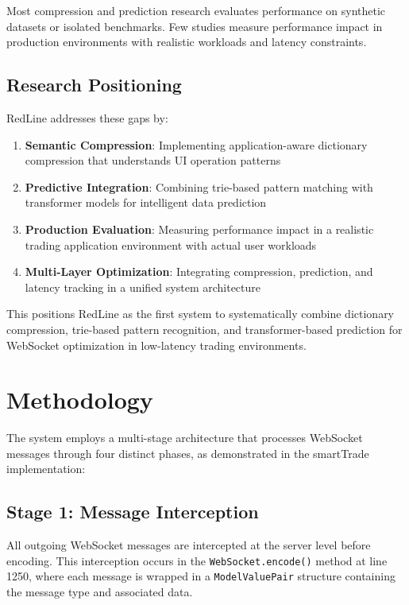 \documentclass[12pt,a4paper]{article}
\begin{document}
Most compression and prediction research evaluates performance on synthetic datasets or isolated benchmarks. Few studies measure performance impact in production environments with realistic workloads and latency constraints.

\subsection{Research Positioning}

RedLine addresses these gaps by:

\begin{enumerate}
    \item \textbf{Semantic Compression}: Implementing application-aware dictionary compression that understands UI operation patterns
    \item \textbf{Predictive Integration}: Combining trie-based pattern matching with transformer models for intelligent data prediction
    \item \textbf{Production Evaluation}: Measuring performance impact in a realistic trading application environment with actual user workloads
    \item \textbf{Multi-Layer Optimization}: Integrating compression, prediction, and latency tracking in a unified system architecture
\end{enumerate}

This positions RedLine as the first system to systematically combine dictionary compression, trie-based pattern recognition, and transformer-based prediction for WebSocket optimization in low-latency trading environments.

\section{Methodology}

The system employs a multi-stage architecture that processes WebSocket messages through four distinct phases, as demonstrated in the smartTrade implementation:

\subsection{Stage 1: Message Interception}

All outgoing WebSocket messages are intercepted at the server level before encoding. This interception occurs in the \texttt{WebSocket.encode()} method at line 1250, where each message is wrapped in a \texttt{ModelValuePair} structure containing the message type and associated data.
\end{document}
